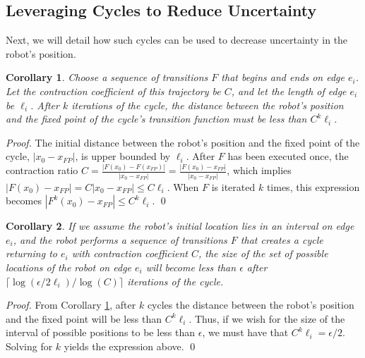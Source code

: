 \documentclass[sageh,times,Review]{sagej}
\newtheorem{corollary}{Corollary}
\begin{document}
\subsection{Leveraging Cycles to Reduce Uncertainty}

Next, we will detail how such cycles can be used to decrease uncertainty in the
robot's position.

\begin{corollary} \label{coro:shrink}
Choose a sequence of transitions $F$ that begins and ends on edge $e_i$. Let the
contraction coefficient of this trajectory be $C$, and let the length of edge $e_i$
be $\ell_i$. After $k$ iterations of the cycle,
the distance between the robot's position and the fixed point of the cycle's transition
function must be less than $C^k \ell_i$.
\end{corollary}

\begin{proof}
The initial distance between the robot's position and the fixed point of
the cycle, $|x_0 - x_{FP}|$, is upper bounded by $\ell_i$. After $F$ has been
executed once, the contraction ratio $C = \frac{|F(x_0) - F(x_{FP})|}{|x_0 -
x_{FP}|} = \frac{|F(x_0) - x_{FP}|}{|x_0 - x_{FP}|}$, which implies $|F(x_0) - x_{FP}|
= C |x_0 - x_{FP}| \leq C \ell_i$. When $F$ is iterated $k$ times, this
expression becomes $|F^k(x_0) - x_{FP}| \leq C^k \ell_i$. \qed
\end{proof}

\begin{corollary}

If we assume the robot's initial location lies in an interval on edge $e_i$, 
and the robot performs a sequence of transitions $F$ that creates a cycle
returning to $e_i$ with contraction coefficient $C$, the size of the set of
possible locations of the robot on edge $e_i$ will become less than $\epsilon$
after $\lceil \log(\epsilon/2 \ell_i)/\log(C) \rceil$ iterations of the 
cycle.
\end{corollary}

\begin{proof}

From Corollary \ref{coro:shrink}, after $k$ cycles the distance between the
robot's position and the fixed point will be less than $C^k \ell_i$. Thus, if we
wish for the size of the interval of possible positions to be less than
$\epsilon$, we must have that $C^k \ell_i = \epsilon / 2$. Solving for $k$
yields the expression above. \qed

\end{proof}
\end{document}
